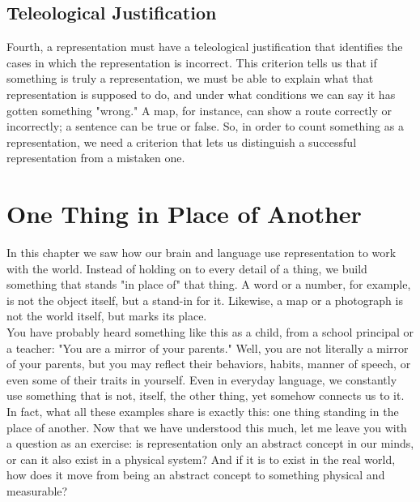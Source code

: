 \subsection{Teleological Justification}
\label{sub:criterion-teleological}
Fourth, a representation must have a teleological justification that identifies the cases in which the representation is incorrect. This criterion tells us that if something is truly a representation, we must be able to explain what that representation is supposed to do, and under what conditions we can say it has gotten something "wrong." A map, for instance, can show a route correctly or incorrectly; a sentence can be true or false. So, in order to count something as a representation, we need a criterion that lets us distinguish a successful representation from a mistaken one.\newpage
\section{One Thing in Place of Another}
\label{sec:something-in-place-of-another}
In this chapter we saw how our brain and language use representation to work with the world. Instead of holding on to every detail of a thing, we build something that stands "in place of" that thing. A word or a number, for example, is not the object itself, but a stand-in for it. Likewise, a map or a photograph is not the world itself, but marks its place.\\
You have probably heard something like this as a child, from a school principal or a teacher: "You are a mirror of your parents." Well, you are not literally a mirror of your parents, but you may reflect their behaviors, habits, manner of speech, or even some of their traits in yourself. Even in everyday language, we constantly use something that is not, itself, the other thing, yet somehow connects us to it.\\
In fact, what all these examples share is exactly this: one thing standing in the place of another. Now that we have understood this much, let me leave you with a question as an exercise: is representation only an abstract concept in our minds, or can it also exist in a physical system? And if it is to exist in the real world, how does it move from being an abstract concept to something physical and measurable?